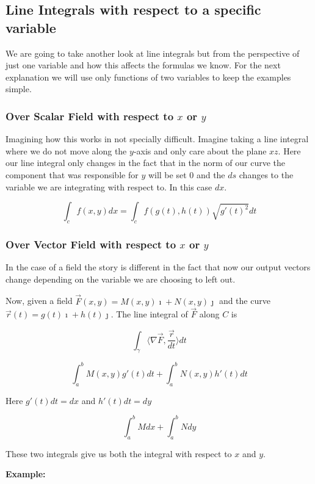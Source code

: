 \subsection{Line Integrals with respect to a specific variable}

We are going to take another look at line integrals but from the perspective of just one variable and how 
this affects the formulas we know. For the next explanation we will use only functions of two variables 
to keep the examples simple.

\subsubsection{Over Scalar Field with respect to \texorpdfstring{\(x\) or \(y\)}{}}

Imagining how this works in not specially difficult. Imagine taking a line integral where we do not move 
along the \(y\)-axis and only care about the plane \(xz\). Here our line integral only changes in the 
fact that in the norm of our curve the component that was responsible for \(y\) will be set 0 and the 
\(ds\) changes to the variable we are integrating with respect to. In this case \(dx\).

\[
    \int_{c} f(x,y)dx = \int_{c} f(g(t), h(t)) \sqrt{g'(t)^2}dt 
\]

\subsubsection{Over Vector Field with respect to \texorpdfstring{\(x\) or \(y\)}{}}

In the case of a field the story is different in the fact that now our output vectors change depending 
on the variable we are choosing to left out.

Now, given a field \(\vec{F}(x,y) = M(x,y)\imath + N(x,y)\jmath\) and the curve
 \(\vec{r}(t) = g(t)\imath + h(t)\jmath\). The line integral of \(\vec{F}\) along \(C\) is 

\[
    \int_\gamma \langle \nabla \vec{F}, \frac{\vec{r}}{dt} \rangle dt
\]

\[
    \int_{a}^{b} M(x,y)g'(t)dt + \int_{a}^{b} N(x,y)h'(t)dt
\]

Here \(g'(t)dt = dx\) and \(h'(t)dt = dy\)

\[
    \int_{a}^{b} Mdx + \int_{a}^{b} Ndy
\]

These two integrals give us both the integral with respect to \(x\) and \(y\).

\textbf{Example:}

